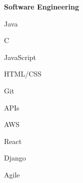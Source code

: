 \documentclass{article}
\newcommand{\headingList}[1]{\vspace*{5pt}\textbf{#1}}
\begin{document}
\headingList{Software Engineering}
\begin{itemize*}[label=$|$]
    \item Java
    \item C
    \item JavaScript 
    \item HTML/CSS 
    \item Git
    \item APIs
    \item AWS
    \item React
    \item Django
    \item Agile
\end{itemize*}
\end{document}
